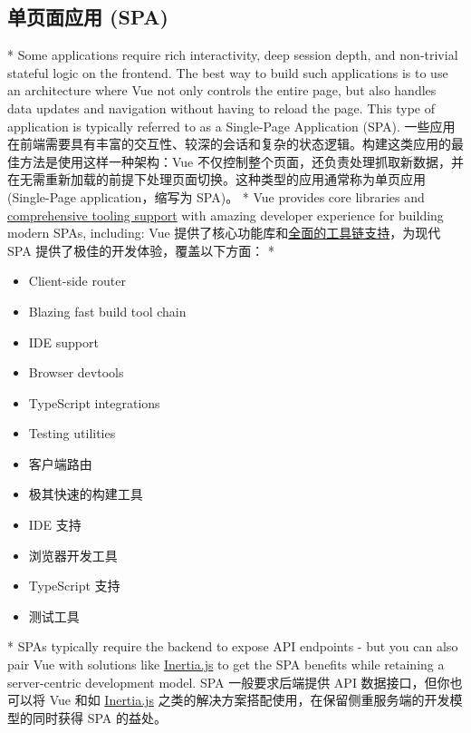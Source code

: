 \begin{paracol}{2}
\subsection{单页面应用 (SPA)}
\switchcolumn[0]*%
Some applications require rich interactivity, deep session depth, and
non-trivial stateful logic on the frontend. The best way to build such
applications is to use an architecture where Vue not only controls the
entire page, but also handles data updates and navigation without having
to reload the page. This type of application is typically referred to as
a Single-Page Application (SPA).
\switchcolumn
一些应用在前端需要具有丰富的交互性、较深的会话和复杂的状态逻辑。构建这类应用的最佳方法是使用这样一种架构：Vue
不仅控制整个页面，还负责处理抓取新数据，并在无需重新加载的前提下处理页面切换。这种类型的应用通常称为单页应用
(Single-Page application，缩写为 SPA)。
\switchcolumn[0]*%
Vue provides core libraries and
\href{https://vuejs.org/guide/scaling-up/tooling.html}{comprehensive
tooling support} with amazing developer experience for building modern
SPAs, including:
\switchcolumn
Vue
提供了核心功能库和\href{https://cn.vuejs.org/guide/scaling-up/tooling.html}{全面的工具链支持}，为现代
SPA 提供了极佳的开发体验，覆盖以下方面：
\switchcolumn[0]*%
\begin{itemize}
\item
  Client-side router
\item
  Blazing fast build tool chain
\item
  IDE support
\item
  Browser devtools
\item
  TypeScript integrations
\item
  Testing utilities
\end{itemize}
\switchcolumn
\begin{itemize}
\item
  客户端路由
\item
  极其快速的构建工具
\item
  IDE 支持
\item
  浏览器开发工具
\item
  TypeScript 支持
\item
  测试工具
\end{itemize}
\switchcolumn[0]*%
SPAs typically require the backend to expose API endpoints - but you can
also pair Vue with solutions like
\href{https://inertiajs.com/}{Inertia.js} to get the SPA benefits while
retaining a server-centric development model.
\switchcolumn
SPA 一般要求后端提供 API 数据接口，但你也可以将 Vue 和如
\href{https://inertiajs.com/}{Inertia.js}
之类的解决方案搭配使用，在保留侧重服务端的开发模型的同时获得 SPA
的益处。
\end{paracol}



